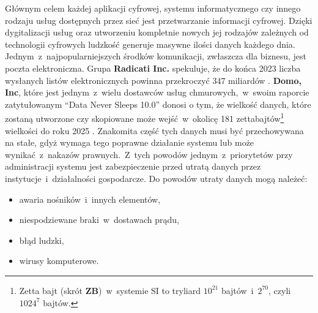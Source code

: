 Głównym celem każdej aplikacji cyfrowej, systemu informatycznego czy innego rodzaju usług dostępnych przez sieć jest przetwarzanie informacji cyfrowej. Dzięki dygitalizacji usług oraz utworzeniu kompletnie nowych jej rodzajów zależnych od technologii cyfrowych ludzkość generuje masywne ilości danych każdego dnia. Jednym~z~najpopularniejszych środków komunikacji, zwłaszcza dla biznesu, jest poczta elektroniczna. Grupa \textbf{Radicati Inc.} spekuluje, że do końca 2023 liczba wysłanych listów elektronicznych powinna przekroczyć 347 miliardów \cite{radicati2019}.
\textbf{Domo, Inc}, które jest jednym~z~wielu dostawców usług chmurowych,~w~swoim raporcie zatytułowanym 
\foreignquote{english}{Data Never Sleeps 10.0} donosi o tym, że wielkość danych, które zostaną utworzone czy skopiowane może wejść~w~okolicę 181 zettabajtów\footnote{Zetta bajt (skrót \textbf{ZB})~w~systemie SI to tryliard $10^{21}$ bajtów~i~$2^{70}$, czyli $1024^{7}$ bajtów.} wielkości do roku 2025 \cite{domo10}. Znakomita część tych danych musi być przechowywana na stałe, gdyż wymaga tego poprawne działanie systemu lub może wynikać~z~nakazów prawnych.~Z~tych powodów jednym~z~priorytetów przy administracji systemu jest zabezpieczenie przed utratą danych przez instytucje~i~działalności gospodarcze.
Do powodów utraty danych mogą należeć:
\begin{itemize}
    \item awaria nośników~i~innych elementów,
    \item niespodziewane braki~w~dostawach prądu,
    \item błąd ludzki,
    \item wirusy komputerowe.
\end{itemize}

